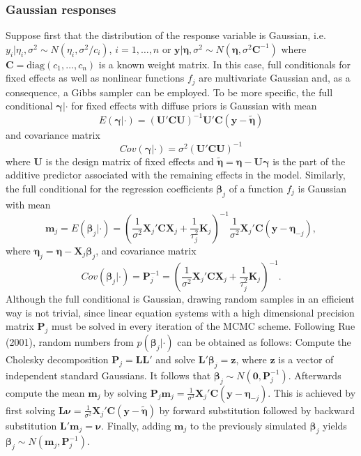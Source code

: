 \documentclass[11pt,a4paper,twoside]{bayesxarticle}
\newcommand{\diag}{\mbox{diag}}
\def \Kvec {\vec{K}}
\def \Pvec {\vec{P}}
\def \betavec {\boldsymbol{\beta}}
\def \etavec {\boldsymbol{\eta}}
\def \gammavec {\boldsymbol{\gamma}}
\def \nuvec {\boldsymbol{\nu}}
\def \yvec {\mathbf{y}}
\def \zvec {\mathbf{z}}
\def \mvec {\mathbf{m}}
\def \Cvec {\mathbf{C}}
\def \Kvec {\mathbf{K}}
\def \Lvec {\mathbf{L}}
\def \Uvec {\mathbf{U}}
\def \Cvec {\mathbf{C}}
\def \Pvec {\mathbf{P}}
\def \Xvec {\mathbf{X}}
\def \nullvec {\boldsymbol{0}}
\begin{document}
\subsubsection{Gaussian responses}

Suppose first that the distribution of the response variable is
Gaussian, i.e. $y_i | \eta_i, \sigma^2 \sim N(\eta_i,\sigma^2/c_i)$,
$i=1,\dots,n$ or $\yvec | \etavec, \sigma^2 \sim N(\etavec,\sigma^2 \Cvec^{-1})$
where $\Cvec = \diag(c_1,\dots,c_n)$ is a known weight matrix. In this
case, full conditionals for fixed effects as well as nonlinear
functions $f_j$ are multivariate Gaussian and, as a consequence, a
Gibbs sampler can be employed. To be more specific, the full
conditional $\gammavec | \cdot$ for fixed effects with diffuse priors
is Gaussian with mean
\begin{equation}\label{meanfixed}
 E(\gammavec | \cdot) = (\Uvec'\Cvec  \Uvec)^{-1}\Uvec'\Cvec(\yvec-\tilde{\etavec})
\end{equation}
and covariance matrix
\begin{equation}
\label{covfixed} Cov(\gammavec | \cdot ) = \sigma^2 (\Uvec'\Cvec \Uvec)^{-1}
\end{equation}
where $\Uvec$ is the design matrix of fixed effects and
$\tilde{\etavec}=\etavec-\Uvec \gammavec$ is the part of the additive predictor
associated with the remaining effects in the model. Similarly, the
full conditional for the regression coefficients $\betavec_j$ of a
function $f_j$ is Gaussian with mean
\begin{equation}
\label{meangaussian} \mvec_j = E(\betavec_j | \cdot) = \left(
\frac{1}{\sigma^2} \Xvec_j' \Cvec \Xvec_j + \frac{1}{\tau_j^2} \Kvec_j \right)^{-1}
\frac{1}{\sigma^2}\Xvec_j' \Cvec(\yvec-\etavec_{-j}),
\end{equation}
where $\etavec_j=\etavec-\Xvec_j\betavec_j$, and covariance matrix
\begin{equation}
\label{covgaussian} Cov(\betavec_j | \cdot) = \Pvec_j^{-1} = \left(
\frac{1}{\sigma^2} \Xvec_j' \Cvec \Xvec_j + \frac{1}{\tau_j^2} \Kvec_j \right)^{-1}.
\end{equation}
Although the full conditional is Gaussian, drawing random samples in
an efficient way is not trivial, since linear equation systems with
a high dimensional precision matrix $\Pvec_j$ must be solved in every
iteration of the MCMC scheme. Following Rue (2001), random numbers
from $p(\betavec_j | \cdot)$ can be obtained as follows: Compute the
Cholesky decomposition $\Pvec_j = \Lvec \Lvec'$ and solve $\Lvec' \betavec_j = \zvec$,
where $\zvec$ is a vector of independent standard Gaussians. It follows
that $\betavec_j \sim N(\nullvec,\Pvec_j^{-1})$. Afterwards compute the mean $\mvec_j$
by solving $\Pvec_j \mvec_j = \frac{1}{\sigma^2} \Xvec_j'\Cvec(\yvec-\etavec_{-j})$. This
is achieved by first solving $\Lvec \nuvec = \frac{1}{\sigma^2}
\Xvec_j'\Cvec(\yvec-\tilde{\etavec})$ by forward substitution followed by backward
substitution $\Lvec' \mvec_j = \nuvec$. Finally, adding $\mvec_j$ to the previously
simulated $\betavec_j$ yields $\betavec_j \sim N(\mvec_j,\Pvec_j^{-1})$.
\end{document}
